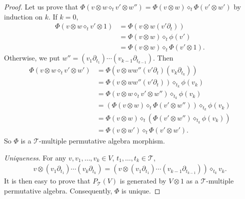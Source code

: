 \documentclass[pdftex]{sigma}
\numberwithin{equation}{section}
\newcommand{\T}{\mathcal{T}}
\begin{document}
\begin{proof}
Let us prove that $\Phi(v\otimes w \diamond_t v'\otimes w'')=\Phi(v\otimes w)\diamond_t \Phi(v'\otimes w')$
by induction on $k$. If $k=0$,
\begin{align*}
\Phi(v\otimes w \diamond_t v'\otimes 1)&=\Phi(v\otimes w(v'\partial_t))\\[.5ex]
&=\Phi(v\otimes w)\diamond_t \phi(v')\\[.5ex]
&=\Phi(v\otimes w)\diamond_t \Phi(v'\otimes 1).
\end{align*}
Otherwise, we put $w''=(v_1\partial_{t_1})\cdots (v_{k-1}\partial_{t_{k-1}})$. Then
\begin{align*}
\Phi(v\otimes w \diamond_t v'\otimes w')&=\Phi(v\otimes ww'' (v'\partial_t)(v_k \partial_{t_k}))\\[.5ex]
&=\Phi(v\otimes ww'' (v'\partial_t))\diamond_{t_k} \phi(v_k)\\[.5ex]
&=\Phi(v\otimes w \diamond_t v'\otimes w'')\diamond_{t_k} \phi(v_k)\\[.5ex]
&=(\Phi(v\otimes w)\diamond_t \Phi(v'\otimes w''))\diamond_{t_k} \phi(v_k)\\[.5ex]
&=\Phi(v\otimes w)\diamond_t (\Phi(v'\otimes w'')\diamond_{t_k} \phi(v_k))\\[.5ex]
&=\Phi(v\otimes w')\diamond_t \Phi(v'\otimes w').
\end{align*}
So $\Phi$ is a $\T$-multiple permutative algebra morphism.

\textit{Uniqueness}. For any $v,v_1,\dots,v_k \in V$, $t_1,\dots,t_k \in \T$,
\begin{gather*}
v\otimes (v_1\partial_{t_1})\cdots (v_k\partial_{t_k})
=(v\otimes (v_1\partial_{t_1})\cdots (v_{k-1}\partial_{t_{k-1}}))\diamond_{t_k} v_k.
\end{gather*}
It is then easy to prove that $P_\T(V)$ is generated by $V\otimes 1$ as a $\T$-multiple permutative algebra.
Consequently, $\Phi$ is unique. \end{proof}
\end{document}
